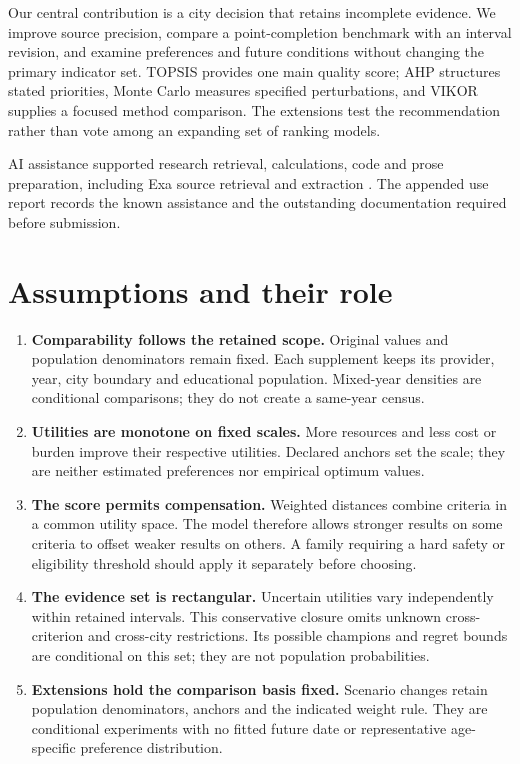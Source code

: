 Our central contribution is a city decision that retains incomplete evidence.
We improve source precision, compare a point-completion benchmark with an
interval revision, and examine preferences and future conditions without
changing the primary indicator set. TOPSIS provides one main quality score;
AHP structures stated priorities, Monte Carlo measures specified perturbations,
and VIKOR supplies a focused method comparison. The extensions test the
recommendation rather than vote among an expanding set of ranking models.

AI assistance supported research retrieval, calculations, code and prose
preparation, including Exa source retrieval and extraction \cite{openai,exa}.
The appended use report records the known assistance
and the outstanding documentation required before submission.

\section{Assumptions and their role}
\begin{enumerate}
\item \textbf{Comparability follows the retained scope.} Original values and
population denominators remain fixed. Each supplement keeps its provider,
year, city boundary and educational population. Mixed-year densities are
conditional comparisons; they do not create a same-year census.
\item \textbf{Utilities are monotone on fixed scales.} More resources and less
cost or burden improve their respective utilities. Declared anchors set the
scale; they are neither estimated preferences nor empirical optimum values.
\item \textbf{The score permits compensation.} Weighted distances combine
criteria in a common utility space. The model therefore allows stronger results
on some criteria to offset weaker results on others. A family requiring a hard
safety or eligibility threshold should apply it separately before choosing.
\item \textbf{The evidence set is rectangular.} Uncertain utilities vary
independently within retained intervals. This conservative closure omits unknown
cross-criterion and cross-city restrictions. Its possible champions and regret
bounds are conditional on this set; they are not population probabilities.
\item \textbf{Extensions hold the comparison basis fixed.} Scenario changes
retain population denominators, anchors and the indicated weight rule. They
are conditional experiments with no fitted future date or representative
age-specific preference distribution.
\end{enumerate}

